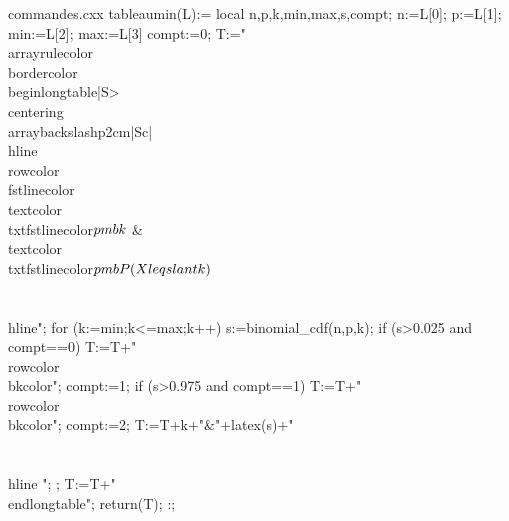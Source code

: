 \begin{VerbatimOut}{commandes.cxx}
tableaumin(L):={
 local n,p,k,min,max,s,compt;
 n:=L[0];
 p:=L[1];
 min:=L[2];
 max:=L[3]
 compt:=0;
T:="\\arrayrulecolor{\\bordercolor}\\begin{longtable}{|S{>{\\centering\\arraybackslash}p{2cm}}|Sc|} \\hline\\rowcolor{\\fstlinecolor}\\textcolor{\\txtfstlinecolor}{$\\pmb{k}$} & \\textcolor{\\txtfstlinecolor}{$\\pmb{P(X\\leqslant k)}$} \\\\ \\hline";
 for (k:=min;k<=max;k++)
 {
         s:=binomial_cdf(n,p,k);
         if (s>0.025 and compt==0) { T:=T+"\\rowcolor{\\bkcolor}"; compt:=1;}
         if (s>0.975 and compt==1) { T:=T+"\\rowcolor{\\bkcolor}"; compt:=2;}                T:=T+k+"&"+latex(s)+"\\\\ \\hline ";
 };
 T:=T+"\\end{longtable}";
 return(T);
}:;


\end{VerbatimOut}
